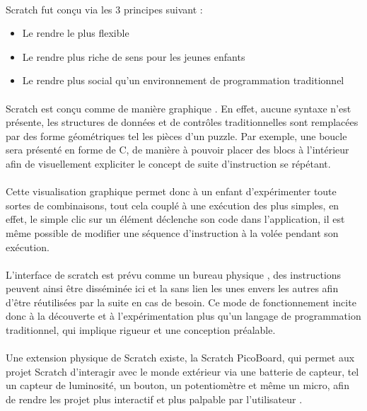 \documentclass[a4paper]{article}
\begin{document}
\paragraph{}
Scratch fut conçu via les 3 principes suivant :
\begin{itemize}
\item Le rendre le plus flexible
\item Le rendre plus riche de sens pour les jeunes enfants
\item Le rendre plus social qu’un environnement de programmation traditionnel
\end{itemize}

\paragraph{}
Scratch est conçu comme de manière graphique \cite{resnick2009scratch}. En effet, aucune syntaxe n’est présente, les structures de données et de contrôles traditionnelles sont remplacées par des forme géométriques tel les pièces d’un puzzle. Par exemple, une boucle sera présenté en forme de C, de manière à pouvoir placer des blocs à l’intérieur afin de visuellement expliciter le concept de suite d’instruction se répétant.

\paragraph{}
Cette visualisation graphique permet donc à un enfant d’expérimenter toute sortes de combinaisons, tout cela couplé à une exécution des plus simples, en effet, le simple clic sur un élément déclenche son code dans l’application, il est même possible de modifier une séquence d’instruction à la volée pendant son exécution.

\paragraph{}
L’interface de scratch est prévu comme un bureau physique \cite{resnick2009scratch}, des instructions peuvent ainsi être disséminée ici et la sans lien les unes envers les autres afin d’être réutilisées par la suite en cas de besoin. Ce mode de fonctionnement incite donc à la découverte et à l’expérimentation plus qu’un langage de programmation traditionnel, qui implique rigueur et une conception préalable.

\paragraph{}
Une extension physique de Scratch existe, la Scratch PicoBoard, qui permet aux projet Scratch d’interagir avec le monde extérieur via une batterie de capteur, tel un capteur de luminosité, un bouton, un potentiomètre et même un micro, afin de rendre les projet plus interactif et plus palpable par l’utilisateur \cite{resnick2009scratch}.
\end{document}
